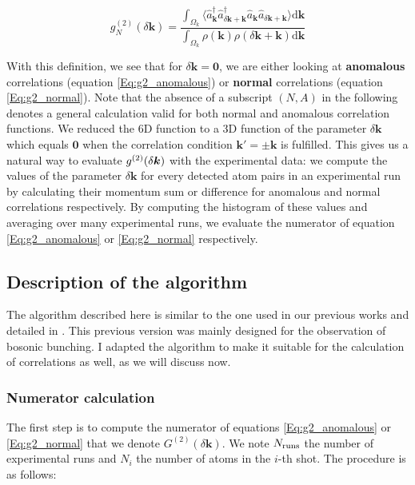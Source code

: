 \begin{equation}
    g_{N}^{(2)} (\delta {\bm k})=\frac{\int_{\Omega_{k}} \langle \hat{a}^{\dagger}_{\bm k} \hat{a}^{\dagger}_{\delta {\bm k} + {\bm k}} \hat{a}_{\bm k} \hat{a}_{\delta {\bm k} + {\bm k}} \rangle \mathrm{d}{\bm k}}{\int_{\Omega_{k}} \rho(\bm k) \rho(\delta {\bm k} + {\bm k}) \mathrm{d}\bm{k}}
    \label{Eq:g2_normal}
\end{equation}

\noindent With this definition, we see that for $\delta \bm{k}=\bm{0}$, we are either looking at \textbf{anomalous} \kmk correlations (equation \ref{Eq:g2_anomalous}) or \textbf{normal} \kk correlations (equation \ref{Eq:g2_normal}). Note that the absence of a subscript $(N,A)$ in the following denotes a general calculation valid for both normal and anomalous correlation functions. We reduced the 6D function to a 3D function of the parameter $\delta \bm{k}$ which equals $\bm{0}$ when the correlation condition $\bm{k'} = \pm \bm{k}$ is fulfilled. This gives us a natural way to evaluate $g^{(2)} (\delta \bm{k})$ with the experimental data: we compute the values of the parameter $\delta \bm{k}$ for every detected atom pairs in an experimental run by calculating their momentum sum or difference for anomalous and normal correlations respectively. By computing the histogram of these values and averaging over many experimental runs, we evaluate the numerator of equation \ref{Eq:g2_anomalous} or \ref{Eq:g2_normal} respectively.

\subsection{Description of the algorithm}

The algorithm described here is similar to the one used in our previous works \cite{carcy2019momentum,cayla2020} and detailed in \cite{carcy_these,cayla_these}. This previous version was mainly designed for the observation of bosonic bunching. I adapted the algorithm to make it suitable for the calculation of \kmk correlations as well, as we will discuss now.

\subsubsection{Numerator calculation}

The first step is to compute the numerator of equations \ref{Eq:g2_anomalous} or \ref{Eq:g2_normal} that we denote $G^{(2)}(\delta \bm{k})$. We note $N_{\rm{runs}}$ the number of experimental runs and $N_{i}$ the number of atoms in the $i$-th shot. The procedure is as follows:

